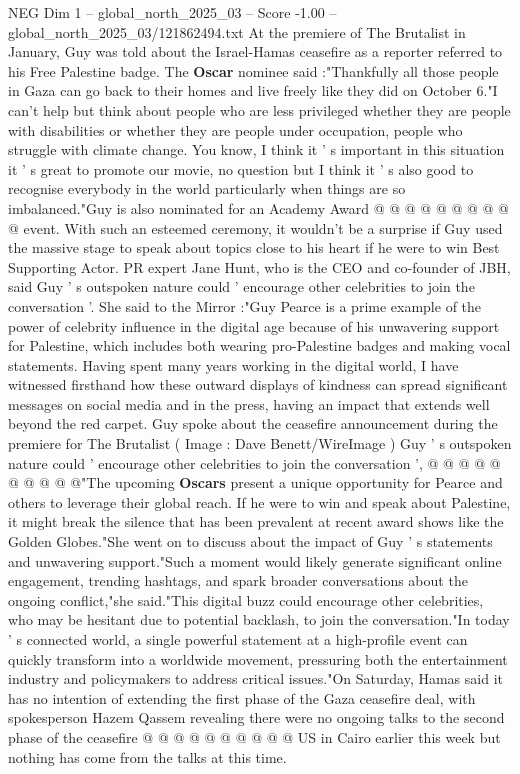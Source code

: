 \begin{textsample}{NEG Dim 1 – global\_north\_2025\_03 – Score -1.00 – global\_north\_2025\_03/121862494.txt}
At the premiere of The Brutalist in January, Guy was told about the Israel-Hamas ceasefire as a reporter referred to his Free Palestine badge.
The \textbf{Oscar} nominee said :"Thankfully all those people in Gaza can go back to their homes and live freely like they did on October 6."I can't help but think about people who are less privileged whether they are people with disabilities or whether they are people under occupation, people who struggle with climate change.
You know, I think it ' s important in this situation it ' s great to promote our movie, no question but I think it ' s also good to recognise everybody in the world particularly when things are so imbalanced."Guy is also nominated for an Academy Award @ @ @ @ @ @ @ @ @ @ event.
With such an esteemed ceremony, it wouldn't be a surprise if Guy used the massive stage to speak about topics close to his heart if he were to win Best Supporting Actor.
PR expert Jane Hunt, who is the CEO and co-founder of JBH, said Guy ' s outspoken nature could ' encourage other celebrities to join the conversation '.
She said to the Mirror :"Guy Pearce is a prime example of the power of celebrity influence in the digital age because of his unwavering support for Palestine, which includes both wearing pro-Palestine badges and making vocal statements.
Having spent many years working in the digital world, I have witnessed firsthand how these outward displays of kindness can spread significant messages on social media and in the press, having an impact that extends well beyond the red carpet.
Guy spoke about the ceasefire announcement during the premiere for The Brutalist ( Image : Dave Benett/WireImage ) Guy ' s outspoken nature could ' encourage other celebrities to join the conversation ', @ @ @ @ @ @ @ @ @ @"The upcoming \textbf{Oscars} present a unique opportunity for Pearce and others to leverage their global reach.
If he were to win and speak about Palestine, it might break the silence that has been prevalent at recent award shows like the Golden Globes."She went on to discuss about the impact of Guy ' s statements and unwavering support."Such a moment would likely generate significant online engagement, trending hashtags, and spark broader conversations about the ongoing conflict,"she said."This digital buzz could encourage other celebrities, who may be hesitant due to potential backlash, to join the conversation."In today ' s connected world, a single powerful statement at a high-profile event can quickly transform into a worldwide movement, pressuring both the entertainment industry and policymakers to address critical issues."On Saturday, Hamas said it has no intention of extending the first phase of the Gaza ceasefire deal, with spokesperson Hazem Qassem revealing there were no ongoing talks to the second phase of the ceasefire @ @ @ @ @ @ @ @ @ @ US in Cairo earlier this week but nothing has come from the talks at this time.

\end{textsample}
